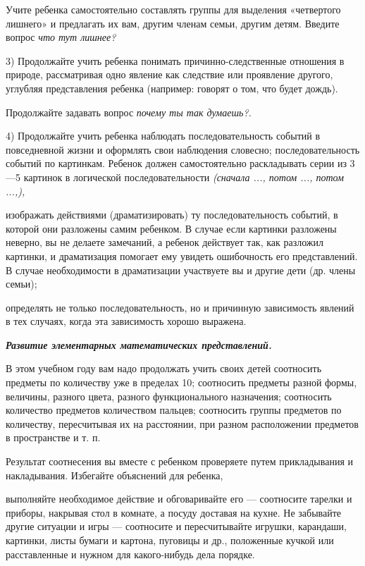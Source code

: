 \documentclass[a5paper]{book}
\renewcommand{\emph}[1]{\textit{#1}}
\begin{document}
Учите ребенка самостоятельно составлять группы для выделения «четвертого
лишнего» и предлагать их вам, другим членам семьи, другим детям. Введите
вопрос \emph{что тут лишнее?}

3) Продолжайте учить ребенка понимать причинно-следственные отношения в
природе, рассматривая одно явление как следствие или проявление другого,
углубляя представления ребенка (например: говорят о том, что будет
дождь).

Продолжайте задавать вопрос \emph{почему ты так думаешь?.}

4) Продолжайте учить ребенка наблюдать последовательность событий в
повседневной жизни и оформлять свои наблюдения словесно;
последовательность событий по картинкам. Ребенок должен самостоятельно
раскладывать серии из 3---5 картинок в логической последовательности
\emph{(сначала ..., потом ..., потом ...,),}

изображать действиями (драматизировать) ту последовательность событий, в
которой они разложены самим ребенком. В случае если картинки разложены
неверно, вы не делаете замечаний, а ребенок действует так, как разложил
картинки, и драматизация помогает ему увидеть ошибочность его
представлений. В случае необходимости в драматизации участвуете вы и
другие дети (др. члены семьи);

определять не только последовательность, но и причинную зависимость
явлений в тех случаях, когда эта зависимость хорошо выражена.

\emph{\textbf{Развитие элементарных математических представлений.}}

В этом учебном году вам надо продолжать учить своих детей соотносить
предметы по количеству уже в пределах 10; соотносить предметы разной
формы, величины, разного цвета, разного функционального назначения;
соотносить количество предметов количеством пальцев; соотносить группы
предметов по количеству, пересчитывая их на расстоянии, при разном
расположении предметов в пространстве и т. п.

Результат соотнесения вы вместе с ребенком проверяете путем
прикладывания и накладывания. Избегайте объяснений для ребенка,

выполняйте необходимое действие и обговаривайте его --- соотносите
тарелки и приборы, накрывая стол в комнате, а посуду доставая на кухне.
Не забывайте другие ситуации и игры --- соотносите и пересчитывайте
игрушки, карандаши, картинки, листы бумаги и картона, пуговицы и др.,
положенные кучкой или расставленные и нужном для какого-нибудь дела
порядке.
\end{document}
